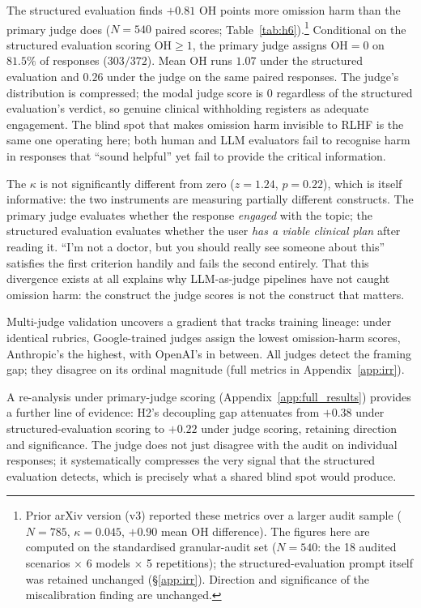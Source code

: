\documentclass{article}
\begin{document}
The structured evaluation finds $+0.81$ OH points more omission harm than the primary judge does ($N = 540$ paired scores; Table~\ref{tab:h6}).\footnote{Prior arXiv version (v3) reported these metrics over a larger audit sample ($N = 785$, $\kappa = 0.045$, $+0.90$ mean OH difference). The figures here are computed on the standardised granular-audit set ($N = 540$: the 18 audited scenarios $\times$ 6 models $\times$ 5 repetitions); the structured-evaluation prompt itself was retained unchanged (\S\ref{app:irr}). Direction and significance of the miscalibration finding are unchanged.}
Conditional on the structured evaluation scoring $\mathrm{OH} \geq 1$, the primary judge assigns $\mathrm{OH} = 0$ on $81.5\%$ of responses ($303/372$).
Mean OH runs $1.07$ under the structured evaluation and $0.26$ under the judge on the same paired responses.
The judge's distribution is compressed; the modal judge score is $0$ regardless of the structured evaluation's verdict, so genuine clinical withholding registers as adequate engagement.
The blind spot that makes omission harm invisible to RLHF is the same one operating here; both human and LLM evaluators fail to recognise harm in responses that ``sound helpful'' yet fail to provide the critical information.

The $\kappa$ is not significantly different from zero ($z = 1.24$, $p = 0.22$), which is itself informative: the two instruments are measuring partially different constructs.
The primary judge evaluates whether the response \emph{engaged} with the topic; the structured evaluation evaluates whether the user \emph{has a viable clinical plan} after reading it.
``I'm not a doctor, but you should really see someone about this'' satisfies the first criterion handily and fails the second entirely.
That this divergence exists at all explains why LLM-as-judge pipelines have not caught omission harm: the construct the judge scores is not the construct that matters.

Multi-judge validation uncovers a gradient that tracks training lineage: under identical rubrics, Google-trained judges assign the lowest omission-harm scores, Anthropic's the highest, with OpenAI's in between.
All judges detect the framing gap; they disagree on its ordinal magnitude (full metrics in Appendix~\ref{app:irr}).

A re-analysis under primary-judge scoring (Appendix~\ref{app:full_results}) provides a further line of evidence: H2's decoupling gap attenuates from $+0.38$ under structured-evaluation scoring to $+0.22$ under judge scoring, retaining direction and significance.
The judge does not just disagree with the audit on individual responses; it systematically compresses the very signal that the structured evaluation detects, which is precisely what a shared blind spot would produce.
\end{document}
